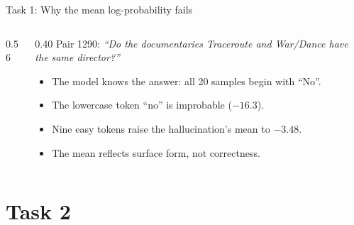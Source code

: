 \documentclass[aspectratio=169,10pt]{beamer}
\begin{document}
\begin{frame}{Task 1: Why the mean log-probability fails}
\begin{columns}[c]
\begin{column}{0.56\textwidth}
\centering\scriptsize
{}
\end{column}
\begin{column}{0.40\textwidth}
\small
Pair 1290: \emph{``Do the documentaries Traceroute and War/Dance have the same director?''}
\begin{itemize}
  \item The model knows the answer: all 20 samples begin with ``No''.
  \item The lowercase token ``no'' is improbable ($-16.3$).
  \item Nine easy tokens raise the hallucination's mean to $-3.48$.
  \item The mean reflects surface form, not correctness.
\end{itemize}
\end{column}
\end{columns}
\end{frame}

\section{Task 2}
\end{document}
